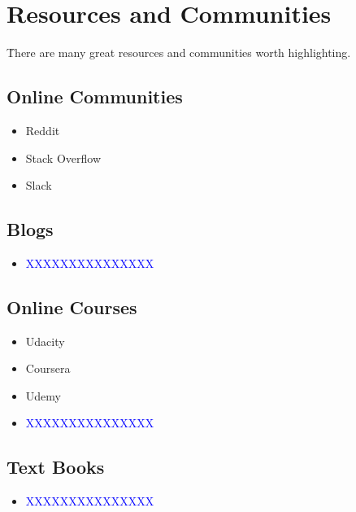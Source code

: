 \chapter{Resources and Communities}

\r{There are many great resources and communities worth highlighting.}


\section{Online Communities}

\begin{itemize}[noitemsep,topsep=0pt]
	
	\item Reddit
	
	\item Stack Overflow
	
	\item Slack
\end{itemize}


\section{Blogs}

\begin{itemize}[noitemsep,topsep=0pt]
	
	\item \textcolor{blue}{XXXXXXXXXXXXXXX}
	
\end{itemize}



\section{Online Courses}

\begin{itemize}[noitemsep,topsep=0pt]
	
	\item Udacity
	\item Coursera
	\item Udemy
	
	\item \textcolor{blue}{XXXXXXXXXXXXXXX}
	
\end{itemize}


\section{Text Books}

\begin{itemize}[noitemsep,topsep=0pt]
	\item \textcolor{blue}{XXXXXXXXXXXXXXX}
	
\end{itemize}